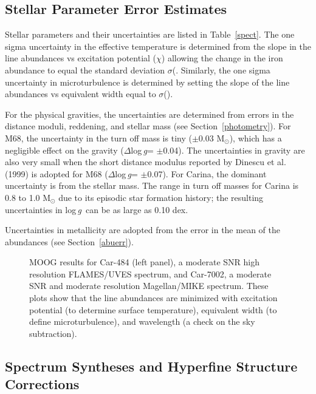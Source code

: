 \documentclass{emulateapj}
\newcommand\logg{log\,{\it g}}
\newcommand\etal{{\rm et al.\,}}
\begin{document}
\subsection{Stellar Parameter Error Estimates}

Stellar parameters and their uncertainties are listed in 
Table~\ref{spect}.
The one sigma uncertainty in the effective temperature is
determined from the slope in the  line abundances 
vs excitation potential ($\chi$) allowing the change 
in the iron abundance to equal the standard deviation 
$\sigma$(.
Similarly, the one sigma uncertainty in microturbulence
is determined by setting the slope 
of the  line abundances vs equivalent width 
equal to $\sigma$().

For the physical gravities, the uncertainties are determined 
from errors in the distance moduli, reddening, and stellar mass
(see Section~\ref{photometry}). 
For M68, the uncertainty in the turn off 
mass is tiny ($\pm$0.03 M$_\odot$), which has a negligible effect 
on the gravity ($\Delta$\logg = $\pm$0.04).
The uncertainties in gravity are also very 
small when the short distance modulus reported by Dinescu \etal (1999)
is adopted for M68 ($\Delta$\logg = $\pm$0.07).
For Carina, the dominant uncertainty is from the 
stellar mass.  The range in turn off masses for 
Carina is 0.8 to 1.0 M$_\odot$ due to its episodic star 
formation history;   the resulting uncertainties in \logg\ 
can be as large as 0.10 dex.

Uncertainties in metallicity are adopted from the 
error in the mean of the  abundances
(see Section~\ref{abuerr}).


\begin{figure*}[t]
\caption{MOOG results for Car-484 (left panel), a moderate SNR high 
resolution FLAMES/UVES spectrum, and Car-7002, a moderate SNR and 
moderate resolution Magellan/MIKE spectrum.   These plots show that 
the \ion{Fe}{1} line abundances are minimized 
with excitation potential (to determine surface temperature),
equivalent width (to define microturbulence), and wavelength 
(a check on the sky subtraction). \\
}
\label{v484}
\end{figure*}


\subsection{Spectrum Syntheses and Hyperfine Structure Corrections }
\end{document}
